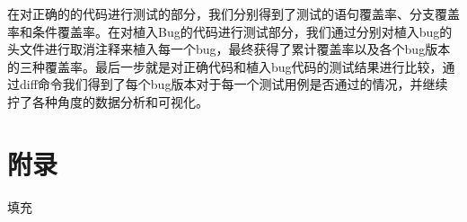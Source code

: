 \documentclass[12pt, a4paper, oneside,bibend=bibtex]{ctexart}
\begin{document}
在对正确的的代码进行测试的部分，我们分别得到了测试的语句覆盖率、分支覆盖率和条件覆盖率。在对植入Bug的代码进行测试部分，我们通过分别对植入bug的头文件进行取消注释来植入每一个bug，最终获得了累计覆盖率以及各个bug版本的三种覆盖率。最后一步就是对正确代码和植入bug代码的测试结果进行比较，通过diff命令我们得到了每个bug版本对于每一个测试用例是否通过的情况，并继续拧了各种角度的数据分析和可视化。





















\section*{附录}
填充
\end{document}
